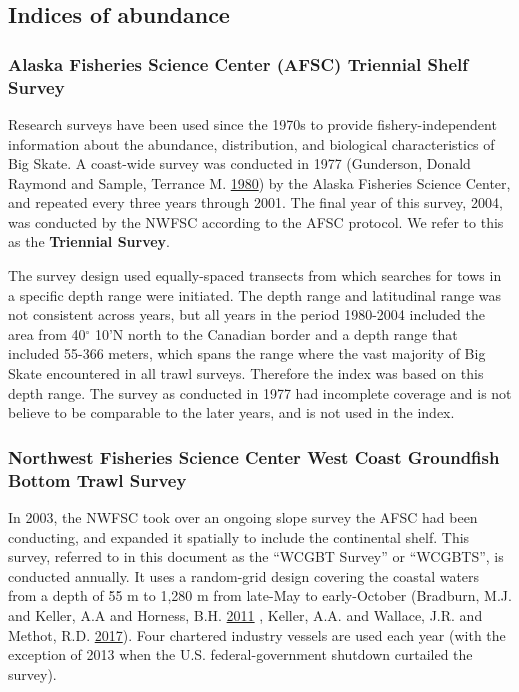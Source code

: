 \documentclass[12pt,]{article}
\begin{document}
\hypertarget{indices-of-abundance}{%
\subsection{Indices of abundance}\label{indices-of-abundance}}

\hypertarget{alaska-fisheries-science-center-afsc-triennial-shelf-survey}{%
\subsubsection{Alaska Fisheries Science Center (AFSC) Triennial Shelf
Survey}\label{alaska-fisheries-science-center-afsc-triennial-shelf-survey}}

Research surveys have been used since the 1970s to provide
fishery-independent information about the abundance, distribution, and
biological characteristics of Big Skate. A coast-wide survey was
conducted in 1977 (Gunderson, Donald Raymond and Sample, Terrance M.
\protect\hyperlink{ref-Gunderson1980}{1980}) by the Alaska Fisheries
Science Center, and repeated every three years through 2001. The final
year of this survey, 2004, was conducted by the NWFSC according to the
AFSC protocol. We refer to this as the \textbf{Triennial Survey}.

The survey design used equally-spaced transects from which searches for
tows in a specific depth range were initiated. The depth range and
latitudinal range was not consistent across years, but all years in the
period 1980-2004 included the area from 40\(^\circ\) 10'N north to the
Canadian border and a depth range that included 55-366 meters, which
spans the range where the vast majority of Big Skate encountered in all
trawl surveys. Therefore the index was based on this depth range. The
survey as conducted in 1977 had incomplete coverage and is not believe
to be comparable to the later years, and is not used in the index.

\hypertarget{northwest-fisheries-science-center-west-coast-groundfish-bottom-trawl-survey}{%
\subsubsection{Northwest Fisheries Science Center West Coast Groundfish
Bottom Trawl
Survey}\label{northwest-fisheries-science-center-west-coast-groundfish-bottom-trawl-survey}}

In 2003, the NWFSC took over an ongoing slope survey the AFSC had been
conducting, and expanded it spatially to include the continental shelf.
This survey, referred to in this document as the ``WCGBT Survey'' or
``WCGBTS'', is conducted annually. It uses a random-grid design covering
the coastal waters from a depth of 55 m to 1,280 m from late-May to
early-October (Bradburn, M.J. and Keller, A.A and Horness, B.H.
\protect\hyperlink{ref-Bradburn2011}{2011} , Keller, A.A. and Wallace,
J.R. and Methot, R.D. \protect\hyperlink{ref-Keller2017}{2017}). Four
chartered industry vessels are used each year (with the exception of
2013 when the U.S. federal-government shutdown curtailed the survey).
\end{document}
